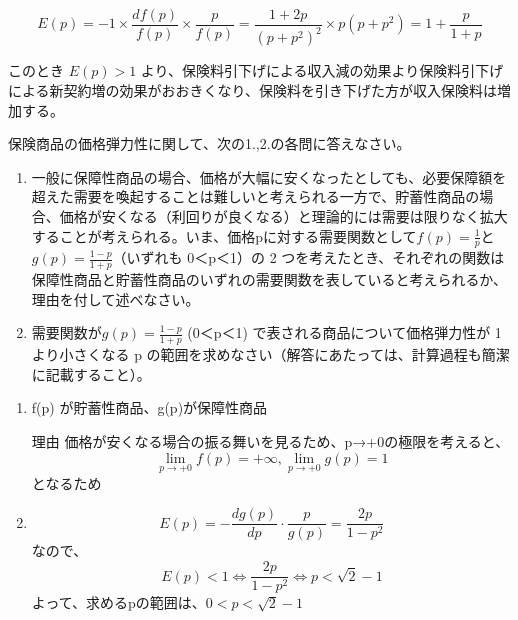 \documentclass[report,gutter=10mm,fore-edge=10mm,uplatex,dvipdfmx]{jlreq}
\begin{document}

\[E(p)=-1\times\frac{df(p)}{f(p)}\times\frac{p}{f(p)}
=\frac{1+2p}{(p+p^2)^2}\times p(p+p^2)
= 1 + \frac{p}{1+p}\]

このとき \(E(p) > 1\)
より、保険料引下げによる収入減の効果より保険料引下げによる新契約増の効果がおおきくなり、保険料を引き下げた方が収入保険料は増加する。


保険商品の価格弾力性に関して、次の1.,2.の各問に答えなさい。

\begin{enumerate}
\item
  一般に保障性商品の場合、価格が大幅に安くなったとしても、必要保障額を超えた需要を喚起することは難しいと考えられる一方で、貯蓄性商品の場合、価格が安くなる（利回りが良くなる）と理論的には需要は限りなく拡大することが考えられる。いま、価格pに対する需要関数として\(f(p)=\frac{1}{p}\)と\(g(p)=\frac{1-p}{1+p}\)（いずれも
  0＜p＜1）の 2
  つを考えたとき、それぞれの関数は保障性商品と貯蓄性商品のいずれの需要関数を表していると考えられるか、理由を付して述べなさい。
\item   需要関数が\(g(p)=\frac{1-p}{1+p}\)   (0＜p＜1)
で表される商品について価格弾力性が  1 より小さくなる p
  の範囲を求めなさい（解答にあたっては、計算過程も簡潔に記載すること）。
\end{enumerate}


\begin{enumerate}
\tightlist
\item
  f(p) が貯蓄性商品、g(p)が保障性商品 

理由
  価格が安くなる場合の振る舞いを見るため、p→+0の極限を考えると、
  \[\lim_{p\to+0}f(p)=+\infty, \lim_{p\to+0}g(p)=1\] となるため
\item
  \[E(p)=-\frac{dg(p)}{dp}\cdot\frac{p}{g(p)}=\frac{2p}{1-p^2}\]なので、
  \[E(p) < 1 \Leftrightarrow\frac{2p}{1-p^2}\Leftrightarrow p < \sqrt{2}-1\]
  よって、求めるpの範囲は、\(0 < p < \sqrt{2}-1\)
\end{enumerate}
\end{document}
